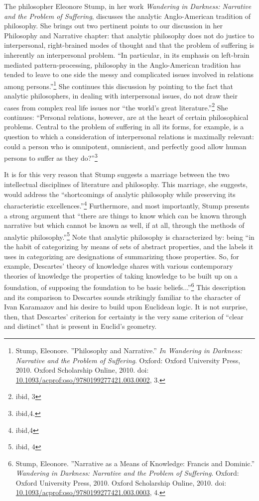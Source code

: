 The philosopher Eleonore Stump, in her work \emph{Wandering in Darkness: Narrative and the Problem of Suffering}, discusses the analytic Anglo-American tradition of philosophy. She brings out two pertinent points to our discussion in her Philosophy and Narrative chapter: that analytic philosophy does not do justice to interpersonal, right-brained modes of thought and that the problem of suffering is inherently an interpersonal problem. ``In particular, in its emphasis on left-brain mediated pattern-processing, philosophy in the Anglo-American tradition has tended to leave to one side the messy and complicated issues involved in relations among persons.''\footnote{Stump, Eleonore. ''Philosophy and Narrative.'' \emph{In \emph{Wandering in Darkness: Narrative and the Problem of Suffering}}. Oxford: Oxford University Press, 2010. Oxford Scholarship Online, 2010. doi: \url{10.1093/acprof:oso/9780199277421.003.0002}, 3.} She continues this discussion by pointing to the fact that analytic philosophers, in dealing with interpersonal issues, do not draw their cases from complex real life issues nor ``the world's great literature.''\footnote{ibid, 3} She continues: ``Personal relations, however, are at the heart of certain philosophical problems. Central to the problem of suffering in all its forms, for example, is a question to which a consideration of interpersonal relations is maximally relevant: could a person who is omnipotent, omniscient, and perfectly good allow human persons to suffer as they do?''\footnote{ibid,4.}

It is for this very reason that Stump suggests a marriage between the two intellectual disciplines of literature and philosophy. This marriage, she suggests, would address the ``shortcomings of analytic philosophy while preserving its characteristic excellences.''\footnote{ibid,4} Furthermore, and most importantly, Stump presents a strong argument that ``there are things to know which can be known through narrative but which cannot be known as well, if at all, through the methods of analytic philosophy.''\footnote{ibid, 4} Note that analytic philosophy is characterized by: being ``in the habit of categorizing by means of sets of abstract properties, and the labels it uses in categorizing are designations of summarizing those properties. So, for example, Descartes' theory of knowledge shares with various contemporary theories of knowledge the properties of taking knowledge to be built up on a foundation, of supposing the foundation to be basic beliefs...''\footnote{Stump, Eleonore. ''Narrative as a Means of Knowledge: Francis and Dominic.'' \emph{\emph{Wandering in Darkness: Narrative and the Problem of Suffering}}. Oxford: Oxford University Press, 2010. Oxford Scholarship Online, 2010. doi: \url{10.1093/acprof:oso/9780199277421.003.0003}, 4.} This description and its comparison to Descartes sounds strikingly familiar to the character of Ivan Karamazov and his desire to build upon Euclidean logic. It is not surprise, then, that Descartes' criterion for certainty is the very same criterion of ``clear and distinct'' that is present in Euclid's geometry.

